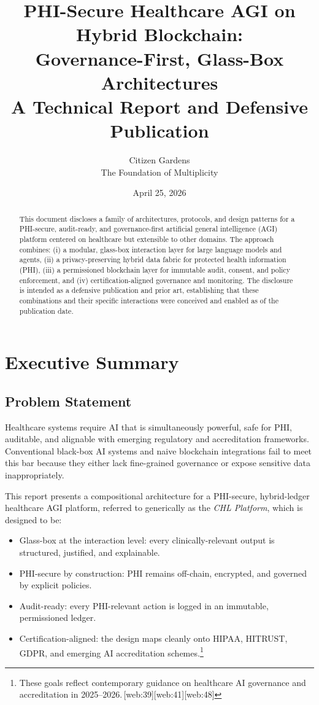 \documentclass[11pt]{article}
\title{%
  \textbf{PHI-Secure Healthcare AGI on Hybrid Blockchain:\\
  Governance-First, Glass-Box Architectures}\\[0.5em]
  \large A Technical Report and Defensive Publication
}
\author{%
  Citizen Gardens\\
  \small The Foundation of Multiplicity}
\date{April 25, 2026}
\begin{document}
\maketitle

\begin{abstract}
This document discloses a family of architectures, protocols, and design patterns for a PHI-secure, audit-ready, and governance-first artificial general intelligence (AGI) platform centered on healthcare but extensible to other domains. 
The approach combines: (i) a modular, glass-box interaction layer for large language models and agents, (ii) a privacy-preserving hybrid data fabric for protected health information (PHI), (iii) a permissioned blockchain layer for immutable audit, consent, and policy enforcement, and (iv) certification-aligned governance and monitoring.
The disclosure is intended as a defensive publication and prior art, establishing that these combinations and their specific interactions were conceived and enabled as of the publication date.
\end{abstract}
\newpage
\tableofcontents

\section{Executive Summary}

\subsection{Problem Statement}

Healthcare systems require AI that is simultaneously powerful, safe for PHI, auditable, and alignable with emerging regulatory and accreditation frameworks. 
Conventional black-box AI systems and naive blockchain integrations fail to meet this bar because they either lack fine-grained governance or expose sensitive data inappropriately.

This report presents a compositional architecture for a PHI-secure, hybrid-ledger healthcare AGI platform, referred to generically as the \emph{CHL Platform}, which is designed to be:
\begin{itemize}[nosep]
  \item Glass-box at the interaction level: every clinically-relevant output is structured, justified, and explainable.
  \item PHI-secure by construction: PHI remains off-chain, encrypted, and governed by explicit policies.
  \item Audit-ready: every PHI-relevant action is logged in an immutable, permissioned ledger.
  \item Certification-aligned: the design maps cleanly onto HIPAA, HITRUST, GDPR, and emerging AI accreditation schemes.\footnote{These goals reflect contemporary guidance on healthcare AI governance and accreditation in 2025--2026.\,[web:39][web:41][web:48]}
\end{itemize}
\end{document}

